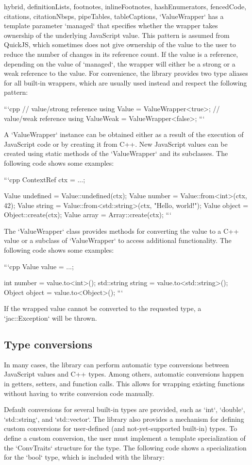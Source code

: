 \begin{markdown*}{%
  hybrid,
  definitionLists,
  footnotes,
  inlineFootnotes,
  hashEnumerators,
  fencedCode,
  citations,
  citationNbsps,
  pipeTables,
  tableCaptions,
}
`ValueWrapper` has a template parameter `managed` that specifies whether the wrapper takes ownership of the underlying JavaScript value. This pattern is assumed from QuickJS, which sometimes does not give ownership of the value to the user to reduce the number of changes in its reference count. If the value is a reference, depending on the value of `managed`, the wrapper will either be a strong or a weak reference to the value. For convenience, the library provides two type aliases for all built-in wrappers, which are usually used instead and respect the following pattern:

```cpp
// value/strong reference
using Value = ValueWrapper<true>;
// value/weak reference
using ValueWeak = ValueWrapper<false>;
```

A `ValueWrapper` instance can be obtained either as a result of the execution of JavaScript code or by creating it from C++. New JavaScript values can be created using static methods of the `ValueWrapper` and its subclasses. The following code shows some examples:

```cpp
ContextRef ctx = ...;

Value undefined = Value::undefined(ctx);
Value number = Value::from<int>(ctx, 42);
Value string = Value::from<std::string>(ctx, "Hello, world!");
Value object = Object::create(ctx);
Value array = Array::create(ctx);
```

The `ValueWrapper` class provides methods for converting the value to a C++ value or a subclass of `ValueWrapper` to access additional functionality. The following code shows some examples:

```cpp
Value value = ...;

int number = value.to<int>();
std::string string = value.to<std::string>();
Object object = value.to<Object>();
```

If the wrapped value cannot be converted to the requested type, a `jac::Exception` will be thrown.

\subsection{Type conversions}

In many cases, the library can perform automatic type conversions between JavaScript values and C++ types. Among others, automatic conversions happen in getters, setters, and function calls. This allows for wrapping existing functions without having to write conversion code manually.

Default conversions for several built-in types are provided, such as `int`, `double`, `std::string`, and `std::vector`. The library also provides a mechanism for defining custom conversions for user-defined (and not-yet-supported built-in) types. To define a custom conversion, the user must implement a template specialization of the `ConvTraits` structure for the type. The following code shows a specialization for the `bool` type, which is included with the library:


\end{markdown*}
